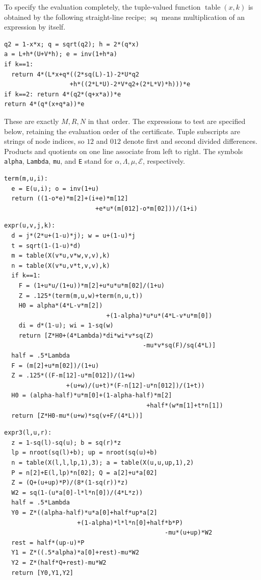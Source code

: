 To specify the evaluation completely, the tuple-valued function
$\operatorname{table}(x,k)$ is obtained by the following straight-line
recipe; $\operatorname{sq}$ means multiplication of an expression by itself.
\begin{verbatim}
q2 = 1-x*x; q = sqrt(q2); h = 2*(q*x)
a = L+h*(U+V*h); e = inv(1+h*a)
if k==1:
  return 4*(L*x+q*((2*sq(L)-1)-2*U*q2
                  +h*((2*L*U)-2*V*q2+(2*L*V)*h)))*e
if k==2: return 4*(q2*(q+x*a))*e
return 4*(q*(x+q*a))*e
\end{verbatim}
These are exactly $M,R,N$ in that order.  The expressions to test are
specified below, retaining the evaluation order of the certificate.
Tuple subscripts are strings of node indices, so $12$ and $012$ denote
first and second divided differences.  Products and quotients on one
line associate from left to right.  The symbols \texttt{alpha},
\texttt{Lambda}, \texttt{mu}, and \texttt{E} stand for
$\alpha,\Lambda,\mu,\mathcal E$, respectively.
\begin{verbatim}
term(m,u,i):
  e = E(u,i); o = inv(1+u)
  return ((1-o*e)*m[2]+(i+e)*m[12]
                         +e*u*(m[012]-o*m[02]))/(1+i)

\end{verbatim}
\begin{samepage}
\begin{verbatim}
expr(u,v,j,k):
  d = j*(2*u+(1-u)*j); w = u+(1-u)*j
  t = sqrt(1-(1-u)*d)
  m = table(X(v*u,v*w,v,v),k)
  n = table(X(v*u,v*t,v,v),k)
  if k==1:
    F = (1+u*u/(1+u))*m[2]+u*u*u*m[02]/(1+u)
    Z = .125*(term(m,u,w)+term(n,u,t))
    H0 = alpha*(4*L-v*m[2])
                            +(1-alpha)*u*u*(4*L-v*u*m[0])
    di = d*(1-u); wi = 1-sq(w)
    return [Z*H0+(4*Lambda)*di*wi*v*sq(Z)
                                      -mu*v*sq(F)/sq(4*L)]
  half = .5*Lambda
  F = (m[2]+u*m[02])/(1+u)
  Z = .125*((F-m[12]-u*m[012])/(1+w)
                 +(u+w)/(u+t)*(F-n[12]-u*n[012])/(1+t))
  H0 = (alpha-half)*u*m[0]+(1-alpha-half)*m[2]
                                       +half*(w*m[1]+t*n[1])
  return [Z*H0-mu*(u+w)*sq(v+F/(4*L))]

\end{verbatim}
\end{samepage}
\par\pagebreak[0]
\begin{samepage}
\begin{verbatim}
expr3(l,u,r):
  z = 1-sq(l)-sq(u); b = sq(r)*z
  lp = nroot(sq(l)+b); up = nroot(sq(u)+b)
  n = table(X(l,l,lp,1),3); a = table(X(u,u,up,1),2)
  P = n[2]+E(l,lp)*n[02]; Q = a[2]+u*a[02]
  Z = (Q+(u+up)*P)/(8*(1-sq(r))*z)
  W2 = sq(1-(u*a[0]-l*l*n[0])/(4*L*z))
  half = .5*Lambda
  Y0 = Z*((alpha-half)*u*a[0]+half*up*a[2]
                    +(1-alpha)*l*l*n[0]+half*b*P)
                                            -mu*(u+up)*W2
  rest = half*(up-u)*P
  Y1 = Z*((.5*alpha)*a[0]+rest)-mu*W2
  Y2 = Z*(half*Q+rest)-mu*W2
  return [Y0,Y1,Y2]
\end{verbatim}
\end{samepage}
